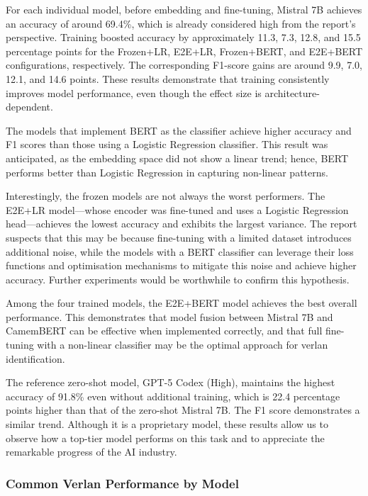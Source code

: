 \documentclass[12pt]{article}
\begin{document}
For each individual model, before embedding and fine-tuning, Mistral 7B achieves an accuracy of around 69.4\%, which is already considered high from the report's perspective. 
Training boosted accuracy by approximately 11.3, 7.3, 12.8, and 15.5 percentage points for the Frozen+LR, E2E+LR, Frozen+BERT, and E2E+BERT configurations, respectively.
The corresponding F1-score gains are around 9.9, 7.0, 12.1, and 14.6 points.
These results demonstrate that training consistently improves model performance, even though the effect size is architecture-dependent.

The models that implement BERT as the classifier achieve higher accuracy and F1 scores than those using a Logistic Regression classifier. 
This result was anticipated, as the embedding space did not show a linear trend; hence, BERT performs better than Logistic Regression in capturing non-linear patterns.

Interestingly, the frozen models are not always the worst performers. 
The E2E+LR model\;---\;whose encoder was fine-tuned and uses a Logistic Regression head\;---\;achieves the lowest accuracy and exhibits the largest variance. 
The report suspects that this may be because fine-tuning with a limited dataset introduces additional noise, while the models with a BERT classifier can leverage their loss functions and optimisation mechanisms to mitigate this noise and achieve higher accuracy. 
Further experiments would be worthwhile to confirm this hypothesis.

Among the four trained models, the E2E+BERT model achieves the best overall performance. 
This demonstrates that model fusion between Mistral 7B and CamemBERT can be effective when implemented correctly, and that full fine-tuning with a non-linear classifier may be the optimal approach for verlan identification.

The reference zero-shot model, GPT-5 Codex (High), maintains the highest accuracy of 91.8\% even without additional training, which is 22.4 percentage points higher than that of the zero-shot Mistral 7B. 
The F1 score demonstrates a similar trend. 
Although it is a proprietary model, these results allow us to observe how a top-tier model performs on this task and to appreciate the remarkable progress of the AI industry.

\subsubsection{Common Verlan Performance by Model}
\end{document}
